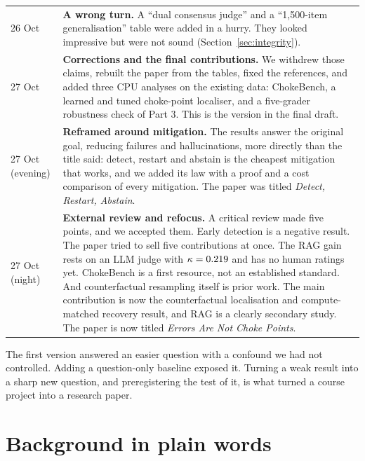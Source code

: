 \documentclass[11pt,a4paper]{article}
\begin{document}
\begin{longtable}{p{2.1cm}p{13.4cm}}
26 Oct & \textbf{A wrong turn.} A ``dual consensus judge'' and a ``1,500-item generalisation'' table
were added in a hurry. They looked impressive but were not sound (Section~\ref{sec:integrity}).\\
27 Oct & \textbf{Corrections and the final contributions.} We withdrew those claims, rebuilt the
paper from the tables, fixed the references, and added three CPU analyses on the existing data:
ChokeBench, a learned and tuned choke-point localiser, and a five-grader robustness check of Part 3.
This is the version in the final draft.\\
27 Oct (evening) & \textbf{Reframed around mitigation.} The results answer the original goal,
reducing failures and hallucinations, more directly than the title said: detect, restart and abstain
is the cheapest mitigation that works, and we added its law with a proof and a cost comparison of every
mitigation. The paper was titled \emph{Detect, Restart, Abstain}.\\
27 Oct (night) & \textbf{External review and refocus.} A critical review made five points, and we
accepted them. Early detection is a negative result. The paper tried to sell five contributions at
once. The RAG gain rests on an LLM judge with $\kappa=0.219$ and has no human ratings yet.
ChokeBench is a first resource, not an established standard. And counterfactual resampling itself
is prior work. The main contribution is now the counterfactual localisation and compute-matched
recovery result, and RAG is a clearly secondary study. The paper is now titled \emph{Errors Are Not
Choke Points}.\\\bottomrule
\end{longtable}

\begin{plain}
The first version answered an easier question with a confound we had not controlled. Adding a
question-only baseline exposed it. Turning a weak result into a sharp new question, and
preregistering the test of it, is what turned a course project into a research paper.
\end{plain}

\section{Background in plain words}\label{sec:background}
\end{document}
